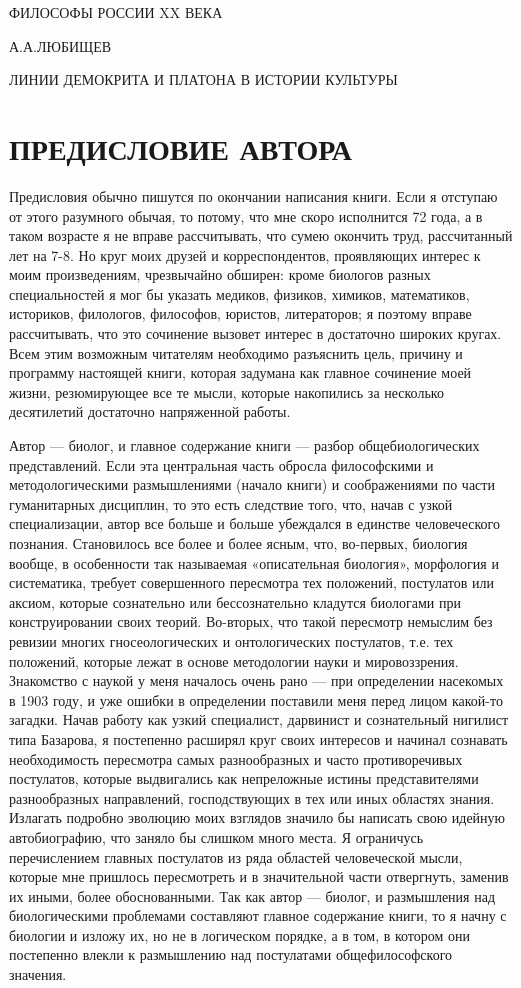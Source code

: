 ФИЛОСОФЫ РОССИИ XX ВЕКА

А.А.ЛЮБИЩЕВ

ЛИНИИ ДЕМОКРИТА И ПЛАТОНА В ИСТОРИИ КУЛЬТУРЫ

\section{ПРЕДИСЛОВИЕ АВТОРА}

Предисловия обычно пишутся по окончании написания книги. Если я
отступаю от этого разумного обычая, то потому, что мне скоро
исполнится 72 года, а в таком возрасте я не вправе рассчитывать, что
сумею окончить труд, рассчитанный лет на 7-8. Но круг моих друзей и
корреспондентов, проявляющих интерес к моим произведениям, чрезвычайно
обширен: кроме биологов разных специальностей я мог бы указать
медиков, физиков, химиков, математиков, историков, филологов,
философов, юристов, литераторов; я поэтому вправе рассчитывать, что
это сочинение вызовет интерес в достаточно широких кругах. Всем этим
возможным читателям необходимо разъяснить цель, причину и программу
настоящей книги, которая задумана как главное сочинение моей жизни,
резюмирующее все те мысли, которые накопились за несколько десятилетий
достаточно напряженной работы.

Автор --- биолог, и главное содержание книги --- разбор
общебиологических представлений. Если эта центральная часть обросла
философскими и методологическими размышлениями (начало книги) и
соображениями по части гуманитарных дисциплин, то это есть следствие
того, что, начав с узкой специализации, автор все больше и больше
убеждался в единстве человеческого познания. Становилось все более и
более ясным, что, во-первых, биология вообще, в особенности так
называемая «описательная биология», морфология и систематика, требует
совершенного пересмотра тех положений, постулатов или аксиом, которые
сознательно или бессознательно кладутся биологами при конструировании
своих теорий. Во-вторых, что такой пересмотр немыслим без ревизии
многих гносеологических и онтологических постулатов, т.е. тех
положений, которые лежат в основе методологии науки и мировоззрения.
Знакомство с наукой у меня началось очень рано --- при определении
насекомых в 1903 году, и уже ошибки в определении поставили меня перед
лицом какой-то загадки. Начав работу как узкий специалист, дарвинист и
сознательный нигилист типа Базарова, я постепенно расширял круг своих
интересов и начинал сознавать необходимость пересмотра самых
разнообразных и часто противоречивых постулатов, которые выдвигались
как непреложные истины представителями разнообразных направлений,
господствующих в тех или иных областях знания. Излагать подробно
эволюцию моих взглядов значило бы написать свою идейную автобиографию,
что заняло бы слишком много места. Я ограничусь перечислением главных
постулатов из ряда областей человеческой мысли, которые мне пришлось
пересмотреть и в значительной части отвергнуть, заменив их иными,
более обоснованными. Так как автор --- биолог, и размышления над
биологическими проблемами составляют главное содержание книги, то я
начну с биологии и изложу их, но не в логическом порядке, а в том, в
котором они постепенно влекли к размышлению над постулатами
общефилософского значения.

